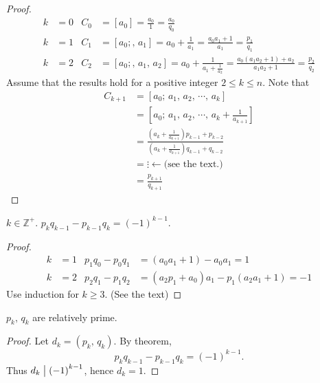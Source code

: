\begin{proof}
    \begin{align*}
        k&=0 & C_0 &= \left[a_0\right] = \frac{a_0}{1} = \frac{a_0}{q_0} \\
        k&=1 & C_1 &= \left[a_0;,\,a_1\right] = a_0 + \frac{1}{a_1} = \frac{a_0a_1+1}{a_1} = \frac{p_1}{q_1} \\
        k&=2 & C_2 &= \left[a_0;,\,a_1,\,a_2\right] = a_0 + \frac{1}{a_1+\frac{1}{a_2}} = \frac{a_0\left(a_1a_2+1\right)+a_2}{a_1a_2+1} = \frac{p_2}{q_2}
    \end{align*}
    Assume that the results hold for a positive integer $2 \leq k \leq n$.
    Note that
    \begin{align*}
        C_{k+1} &= \left[a_0;\,a_1,\,a_2,\,\cdots,\,a_k\right] \\
        &= \left[a_0;\,a_1,\,a_2,\,\cdots,\,a_k+\frac{1}{a_{k+1}}\right] \\
        &= \frac{\left(a_k + \frac{1}{a_{k+1}}\right)p_{k-1}+p_{k-2}}{\left(a_k + \frac{1}{a_{k+1}}\right)q_{k-1}+q_{k-2}} \\
        &= \vdots \leftarrow \mbox{(see the text.)} \\
        &= \frac{p_{k+1}}{q_{k+1}}
    \end{align*}
\end{proof}

\begin{theorem}
    $k \in \mathbb{Z}^+$. $p_k q_{k-1} - p_{k-1} q_k = \left(-1\right)^{k-1}$.
\end{theorem}

\begin{proof}
    \begin{align*}
        k&=1 & p_1q_0 - p_0q_1 &= \left(a_0a_1+1\right)-a_0a_1 = 1 \\
        k&=2 & p_2q_1 - p_1q_2 &= \left(a_2p_1+a_0\right)a_1-p_1\left(a_2a_1+1\right) = -1
    \end{align*}
    Use induction for $k \geq 3$. (See the text)
\end{proof}

\begin{corollary}
    $p_k,\,q_k$ are relatively prime.
\end{corollary}

\begin{proof}
    Let $d_k = \left(p_k,\,q_k\right)$. By theorem,
    \[
        p_kq_{k-1}-p_{k-1}q_k = \left(-1\right)^{k-1}.
    \]
    Thus $d_k \bigm| \left(-1\right)^{k-1}$, hence $d_k = 1$.
\end{proof}

